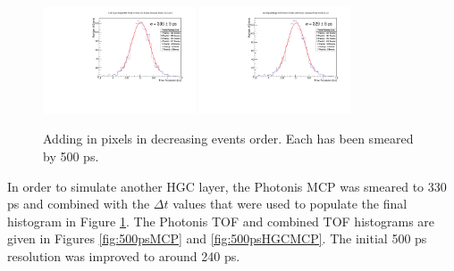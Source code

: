 \documentclass[12pt]{article}
\begin{document}
\begin{figure}[h]
	\includegraphics[width=0.4\textwidth]{SKIROC/SKIROC_6_Pixels500.pdf}
	\includegraphics[width=0.4\textwidth]{SKIROC/SKIROC_7_Pixels500.pdf}
	\caption{Adding in pixels in decreasing events order.
		Each has been smeared by 500 ps.}
	\label{fig:500psAll}
\end{figure}

In order to simulate another HGC layer, the Photonis MCP was smeared to 330 ps and combined with the $\Delta t$ values that were used to populate the final histogram in Figure \ref{fig:500psAll}. 
The Photonis TOF and combined TOF histograms are given in Figures \ref{fig:500psMCP} and \ref{fig:500psHGCMCP}. 
The initial 500 ps resolution was improved to around 240 ps. 
\end{document}
